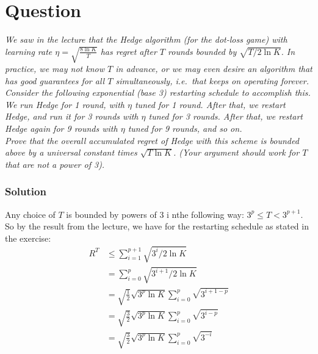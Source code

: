\documentclass{article}
\newcounter{counterquestion}
\newenvironment{question}[1]
{
\stepcounter{counterquestion}
\section*{Question \thecounterquestion}
\emph{#1} 
} 
{
}
\newenvironment{solution}
{
\subsubsection*{Solution}
} 
{
}
\begin{document}
\begin{question}{We saw in the lecture that the Hedge algorithm (for the dot-loss game)
with learning rate $\eta = \sqrt{\frac{8 \ln K}{T}}$ has regret after $T$ rounds bounded by $\sqrt{T/2 \ln K}$. In practice, we may not know $T$ in advance, or we may even desire an algorithm that has good guarantees for all $T$ simultaneously, i.e.\ that keeps on operating forever. \\ Consider the following exponential (base 3) restarting schedule to accomplish
this. We run Hedge for 1 round, with $\eta$ tuned for 1 round. After that, we restart Hedge, and run it for 3 rounds with $\eta$ tuned for 3 rounds. After that, we restart Hedge again for 9 rounds with $\eta$ tuned for 9 rounds, and so on. \\ Prove that the overall accumulated regret of Hedge with this scheme is bounded above by a universal constant times $\sqrt{T \ln K}$.  (Your argument should work for $T$ that are not a power of 3).}

\begin{solution}
Any choice of $T$ is bounded by powers of 3 i nthe following way: $3^p\leq T < 3^{p+1}$. So by the result from the lecture, we have for the restarting schedule as stated in the exercise: 
\begin{align*}
R^T&\leq \sum _{i=1} ^{p+1} \sqrt{3^i/2\ln K}\\
&=\sum _{i=0} ^{p} \sqrt{3^{i+1}/2\ln K}\\
&=\sqrt{\frac{1}{2}}\sqrt{3^p \ln K } \sum _{i=0}^p \sqrt{3^{i+1-p}}\\
&=\sqrt{\frac{3}{2}}\sqrt{3^p \ln K } \sum _{i=0}^p \sqrt{3^{i-p}}\\
&=\sqrt{\frac{3}{2}}\sqrt{3^p \ln K } \sum _{i=0}^p \sqrt{3^{-i}}
\end{align*}
\end{solution}

\end{question}
\end{document}
